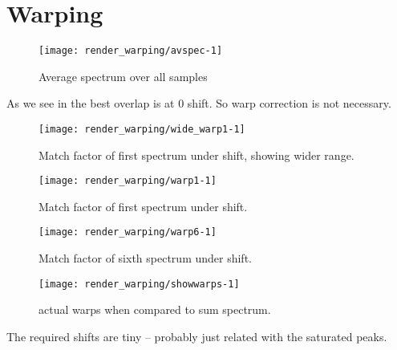 \section{Warping}


\begin{kframe}


{\ttfamily\noindent\bfseries{}}\end{kframe}

\begin{figure}
\texttt{[image: render\_warping/avspec-1]} \caption[Average spectrum over all samples]{Average spectrum over all samples}\label{fig:avspec}
\end{figure}






As we see in  the best overlap is at \num{0} shift.  So warp correction is not necessary.

\begin{figure}
\texttt{[image: render\_warping/wide\_warp1-1]} \caption[Match factor of first spectrum under shift, showing wider range]{Match factor of first spectrum under shift, showing wider range.}\label{fig:wide_warp1}
\end{figure}



\begin{figure}
\texttt{[image: render\_warping/warp1-1]} \caption[Match factor of first spectrum under shift]{Match factor of first spectrum under shift.}\label{fig:warp1}
\end{figure}



\begin{figure}
\texttt{[image: render\_warping/warp6-1]} \caption[Match factor of sixth spectrum under shift]{Match factor of sixth spectrum under shift.}\label{fig:warp6}
\end{figure}





\begin{figure}
\texttt{[image: render\_warping/showwarps-1]} \caption[actual warps when compared to sum spectrum]{actual warps when compared to sum spectrum.}\label{fig:showwarps}
\end{figure}



The required shifts are tiny -- probably just related with the saturated peaks.

